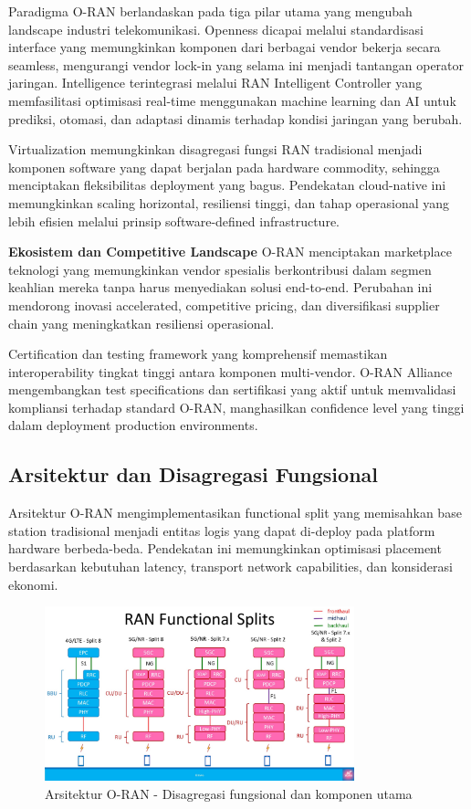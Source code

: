 Paradigma O-RAN berlandaskan pada tiga pilar utama yang mengubah landscape industri telekomunikasi. Openness dicapai melalui standardisasi interface yang memungkinkan komponen dari berbagai vendor bekerja secara seamless, mengurangi vendor lock-in yang selama ini menjadi tantangan operator jaringan. Intelligence terintegrasi melalui RAN Intelligent Controller yang memfasilitasi optimisasi real-time menggunakan machine learning dan AI untuk prediksi, otomasi, dan adaptasi dinamis terhadap kondisi jaringan yang berubah.

Virtualization memungkinkan disagregasi fungsi RAN tradisional menjadi komponen software yang dapat berjalan pada hardware commodity, sehingga menciptakan fleksibilitas deployment yang bagus. Pendekatan cloud-native ini memungkinkan scaling horizontal, resiliensi tinggi, dan tahap operasional yang lebih efisien melalui prinsip software-defined infrastructure.

\textbf{Ekosistem dan Competitive Landscape} O-RAN menciptakan marketplace teknologi yang memungkinkan vendor spesialis berkontribusi dalam segmen keahlian mereka tanpa harus menyediakan solusi end-to-end. Perubahan ini mendorong inovasi accelerated, competitive pricing, dan diversifikasi supplier chain yang meningkatkan resiliensi operasional.

Certification dan testing framework yang komprehensif memastikan interoperability tingkat tinggi antara komponen multi-vendor. O-RAN Alliance mengembangkan test specifications dan sertifikasi yang aktif untuk memvalidasi kompliansi terhadap standard O-RAN, manghasilkan confidence level yang tinggi dalam deployment production environments.

\subsection{Arsitektur dan Disagregasi Fungsional}

Arsitektur O-RAN mengimplementasikan functional split yang memisahkan base station tradisional menjadi entitas logis yang dapat di-deploy pada platform hardware berbeda-beda. Pendekatan ini memungkinkan optimisasi placement berdasarkan kebutuhan latency, transport network capabilities, dan konsiderasi ekonomi.

\begin{figure}[htbp]
    \centering
    \includegraphics[width=0.8\textwidth]{assets/pics/bab3_11.png}
    \caption{Arsitektur O-RAN - Disagregasi fungsional dan komponen utama}
    \label{fig:oran_architecture}
\end{figure}

